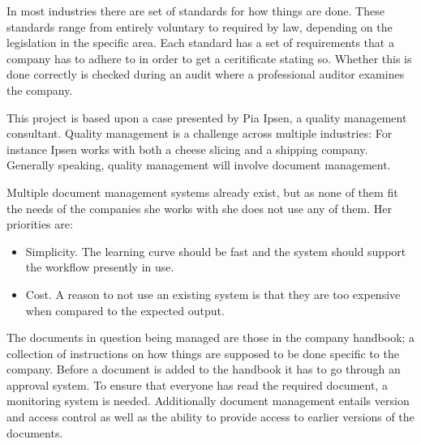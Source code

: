 In most industries there are set of standards for how things are done.
These standards range from  entirely voluntary to required by law, depending on the legislation in the specific area.
Each standard has a set of requirements that a company has to adhere to in order to get a ceritificate stating so.
Whether this is done correctly is checked during an audit where a professional auditor examines the company.

This project is based upon a case presented by Pia Ipsen, a quality management consultant.
Quality management is a challenge across multiple industries: For instance Ipsen works with both a cheese slicing and a shipping company.
Generally speaking, quality management will involve document management.

Multiple document management systems already exist, but as none of them fit the needs of the companies she works with she does not use any of them.
Her priorities are:

\begin{itemize}
\item Simplicity. The learning curve should be fast and the system should support the workflow presently in use.
\item Cost. A reason to not use an existing system is that they are too expensive when compared to the expected output.
\end{itemize}

The documents in question being managed are those in the company handbook; a collection of instructions on how things are supposed to be done specific to the company.
Before a document is added to the handbook it has to go through an approval system.
To ensure that everyone has read the required document, a monitoring system is needed.
Additionally document management entails version and access control as well as the ability to provide access to earlier versions of the documents.
